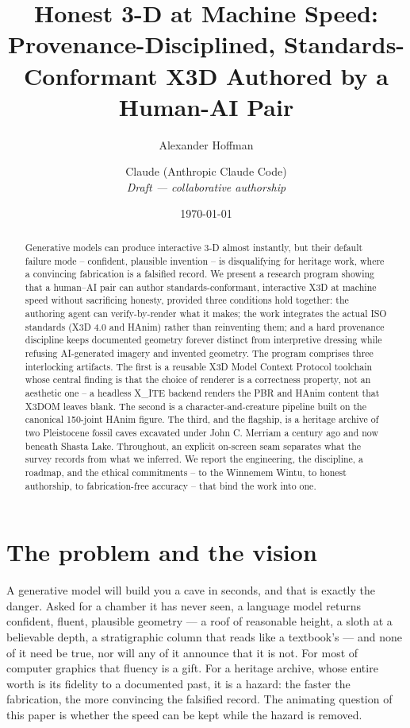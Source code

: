 \documentclass[11pt]{article}
\title{\textbf{Honest 3-D at Machine Speed: Provenance-Disciplined, Standards-Conformant X3D Authored by a Human-AI Pair}}
\author{Alexander Hoffman \and Claude (Anthropic Claude Code)\\[2pt]
  \small\textit{Draft --- collaborative authorship}}
\date{\today}
\begin{document}
\maketitle
\begin{abstract}
Generative models can produce interactive 3-D almost instantly, but their default failure mode -- confident, plausible invention -- is disqualifying for heritage work, where a convincing fabrication is a falsified record. We present a research program showing that a human--AI pair can author standards-conformant, interactive X3D at machine speed without sacrificing honesty, provided three conditions hold together: the authoring agent can verify-by-render what it makes; the work integrates the actual ISO standards (X3D 4.0 and HAnim) rather than reinventing them; and a hard provenance discipline keeps documented geometry forever distinct from interpretive dressing while refusing AI-generated imagery and invented geometry. The program comprises three interlocking artifacts. The first is a reusable X3D Model Context Protocol toolchain whose central finding is that the choice of renderer is a correctness property, not an aesthetic one -- a headless X\_ITE backend renders the PBR and HAnim content that X3DOM leaves blank. The second is a character-and-creature pipeline built on the canonical 150-joint HAnim figure. The third, and the flagship, is a heritage archive of two Pleistocene fossil caves excavated under John C. Merriam a century ago and now beneath Shasta Lake. Throughout, an explicit on-screen seam separates what the survey records from what we inferred. We report the engineering, the discipline, a roadmap, and the ethical commitments -- to the Winnemem Wintu, to honest authorship, to fabrication-free accuracy -- that bind the work into one.
\end{abstract}

\section{The problem and the vision}\label{sec:vision}

A generative model will build you a cave in seconds, and that is exactly the danger. Asked for a chamber it has never seen, a language model returns confident, fluent, plausible geometry --- a roof of reasonable height, a sloth at a believable depth, a stratigraphic column that reads like a textbook's --- and none of it need be true, nor will any of it announce that it is not. For most of computer graphics that fluency is a gift. For a heritage archive, whose entire worth is its fidelity to a documented past, it is a hazard: the faster the fabrication, the more convincing the falsified record. The animating question of this paper is whether the speed can be kept while the hazard is removed.
\end{document}
